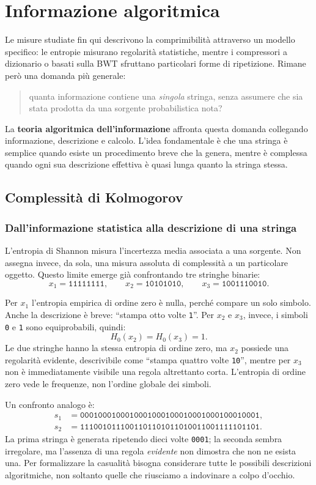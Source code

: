 \documentclass{article}
\theoremstyle{definition}
\numberwithin{equation}{section}
\begin{document}
\section{Informazione algoritmica}
Le misure studiate fin qui descrivono la comprimibilità attraverso un modello
specifico: le entropie misurano regolarità statistiche, mentre i compressori a
dizionario o basati sulla BWT sfruttano particolari forme di ripetizione.
Rimane però una domanda più generale:
\begin{quote}
    quanta informazione contiene una \emph{singola} stringa, senza assumere
    che sia stata prodotta da una sorgente probabilistica nota?
\end{quote}

La \textbf{teoria algoritmica dell'informazione} affronta questa domanda
collegando informazione, descrizione e calcolo. L'idea fondamentale è che una
stringa è semplice quando esiste un procedimento breve che la genera, mentre è
complessa quando ogni sua descrizione effettiva è quasi lunga quanto la stringa
stessa.

\subsection{Complessità di Kolmogorov}
\subsubsection{Dall'informazione statistica alla descrizione di una stringa}
L'entropia di Shannon misura l'incertezza media associata a una sorgente. Non
assegna invece, da sola, una misura assoluta di complessità a un particolare
oggetto. Questo limite emerge già confrontando tre stringhe binarie:
\[
    x_1=\texttt{11111111},
    \qquad
    x_2=\texttt{10101010},
    \qquad
    x_3=\texttt{1001110010}.
\]

Per $x_1$ l'entropia empirica di ordine zero è nulla, perché compare un solo
simbolo. Anche la descrizione è breve: ``stampa otto volte \texttt{1}''. Per
$x_2$ e $x_3$, invece, i simboli \texttt{0} e \texttt{1} sono equiprobabili,
quindi:
\[
    H_0(x_2)=H_0(x_3)=1.
\]
Le due stringhe hanno la stessa entropia di ordine zero, ma $x_2$ possiede una
regolarità evidente, descrivibile come ``stampa quattro volte
\texttt{10}'', mentre per $x_3$ non è immediatamente visibile una regola
altrettanto corta. L'entropia di ordine zero vede le frequenze, non l'ordine
globale dei simboli.

Un confronto analogo è:
\[
    \begin{split}
        s_1 & =\texttt{0001000100010001000100010001000100010001}, \\
        s_2 & =\texttt{1110010111001101101011010011001111101101}.
    \end{split}
\]
La prima stringa è generata ripetendo dieci volte \texttt{0001}; la seconda
sembra irregolare, ma l'assenza di una regola \emph{evidente} non dimostra che
non ne esista una. Per formalizzare la casualità bisogna considerare tutte le
possibili descrizioni algoritmiche, non soltanto quelle che riusciamo a
indovinare a colpo d'occhio.
\end{document}
